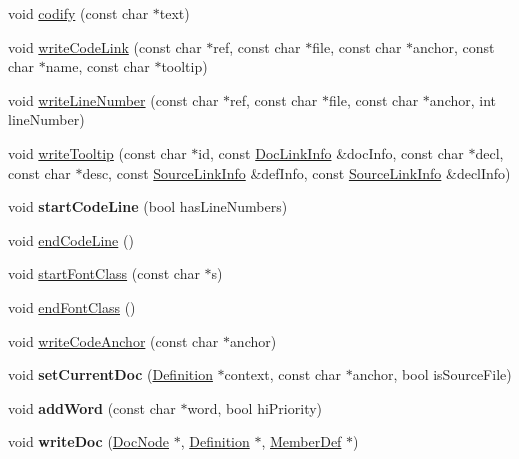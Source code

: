 \begin{DoxyCompactItemize}
\item 
void \hyperlink{class_html_generator_a96b26b0cb63719fd5370a9a04d2ebb38}{codify} (const char $\ast$text)
\item 
void \hyperlink{class_html_generator_ab3866da052a840c400b4990dd2ddf61b}{write\-Code\-Link} (const char $\ast$ref, const char $\ast$file, const char $\ast$anchor, const char $\ast$name, const char $\ast$tooltip)
\item 
void \hyperlink{class_html_generator_a70366bf2bad21036a14d68e9ef532809}{write\-Line\-Number} (const char $\ast$ref, const char $\ast$file, const char $\ast$anchor, int line\-Number)
\item 
void \hyperlink{class_html_generator_acc6f74ac2670196668c05d4156eec872}{write\-Tooltip} (const char $\ast$id, const \hyperlink{struct_doc_link_info}{Doc\-Link\-Info} \&doc\-Info, const char $\ast$decl, const char $\ast$desc, const \hyperlink{struct_source_link_info}{Source\-Link\-Info} \&def\-Info, const \hyperlink{struct_source_link_info}{Source\-Link\-Info} \&decl\-Info)
\item 
\hypertarget{class_html_generator_a87ce1b5dc3773f8bb8c74ca64d99022f}{void {\bfseries start\-Code\-Line} (bool has\-Line\-Numbers)}\label{class_html_generator_a87ce1b5dc3773f8bb8c74ca64d99022f}

\item 
void \hyperlink{class_html_generator_adbe51a89cf6f9573b3434e7cfda81a7c}{end\-Code\-Line} ()
\item 
void \hyperlink{class_html_generator_a9326eecf5c7d10d7f6fece1e7fab75d8}{start\-Font\-Class} (const char $\ast$s)
\item 
void \hyperlink{class_html_generator_ab7851025d80a6d1ed6dd8e25016136e1}{end\-Font\-Class} ()
\item 
void \hyperlink{class_html_generator_a5bdf52860d0fb01aa6bf45625d70abbc}{write\-Code\-Anchor} (const char $\ast$anchor)
\item 
\hypertarget{class_html_generator_a619be3ae6560f96acfc84607ea2d0cd2}{void {\bfseries set\-Current\-Doc} (\hyperlink{class_definition}{Definition} $\ast$context, const char $\ast$anchor, bool is\-Source\-File)}\label{class_html_generator_a619be3ae6560f96acfc84607ea2d0cd2}

\item 
\hypertarget{class_html_generator_aef206d2620c6a5bc4afcb9a3874dc6b2}{void {\bfseries add\-Word} (const char $\ast$word, bool hi\-Priority)}\label{class_html_generator_aef206d2620c6a5bc4afcb9a3874dc6b2}

\item 
\hypertarget{class_html_generator_a3cd433489757d690eee323e816d9c663}{void {\bfseries write\-Doc} (\hyperlink{class_doc_node}{Doc\-Node} $\ast$, \hyperlink{class_definition}{Definition} $\ast$, \hyperlink{class_member_def}{Member\-Def} $\ast$)}\label{class_html_generator_a3cd433489757d690eee323e816d9c663}


\end{DoxyCompactItemize}
